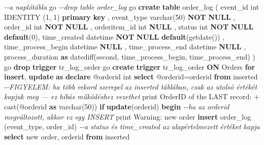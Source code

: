 \documentclass[
  magyar,
]{article}
\newenvironment{Shaded}{}{}
\newcommand{\CommentTok}[1]{\textcolor[rgb]{0.38,0.63,0.69}{\textit{#1}}}
\newcommand{\ControlFlowTok}[1]{\textcolor[rgb]{0.00,0.44,0.13}{\textbf{#1}}}
\newcommand{\DataTypeTok}[1]{\textcolor[rgb]{0.56,0.13,0.00}{#1}}
\newcommand{\DecValTok}[1]{\textcolor[rgb]{0.25,0.63,0.44}{#1}}
\newcommand{\FunctionTok}[1]{\textcolor[rgb]{0.02,0.16,0.49}{#1}}
\newcommand{\KeywordTok}[1]{\textcolor[rgb]{0.00,0.44,0.13}{\textbf{#1}}}
\newcommand{\NormalTok}[1]{#1}
\newcommand{\OperatorTok}[1]{\textcolor[rgb]{0.40,0.40,0.40}{#1}}
\newcommand{\StringTok}[1]{\textcolor[rgb]{0.25,0.44,0.63}{#1}}
\begin{document}
\begin{Shaded}
\begin{Highlighting}[]
\CommentTok{{-}{-}a naplótábla}
\NormalTok{go}
\CommentTok{{-}{-}drop table order\_log}
\NormalTok{go}
\KeywordTok{create} \KeywordTok{table}\NormalTok{ order\_log (}
\NormalTok{    event\_id }\DataTypeTok{int}\NormalTok{ IDENTITY (}\DecValTok{1}\NormalTok{, }\DecValTok{1}\NormalTok{) }\KeywordTok{primary} \KeywordTok{key}\NormalTok{ ,}
\NormalTok{    event\_type }\DataTypeTok{varchar}\NormalTok{(}\DecValTok{50}\NormalTok{) }\KeywordTok{NOT} \KeywordTok{NULL}\NormalTok{ ,}
\NormalTok{    order\_id }\DataTypeTok{int} \KeywordTok{NOT} \KeywordTok{NULL}\NormalTok{ ,}
\NormalTok{    orderitem\_id }\DataTypeTok{int} \KeywordTok{NULL}\NormalTok{ ,}
\NormalTok{    status }\DataTypeTok{int} \KeywordTok{NOT} \KeywordTok{NULL} \KeywordTok{default}\NormalTok{(}\DecValTok{0}\NormalTok{),}
\NormalTok{    time\_created datetime }\KeywordTok{NOT} \KeywordTok{NULL} \KeywordTok{default}\NormalTok{(getdate()) ,}
\NormalTok{    time\_process\_begin datetime }\KeywordTok{NULL}\NormalTok{ ,}
\NormalTok{    time\_process\_end datetime }\KeywordTok{NULL}\NormalTok{ ,}
\NormalTok{    process\_duration }\KeywordTok{as}\NormalTok{ datediff(}\DataTypeTok{second}\NormalTok{, time\_process\_begin, time\_process\_end)}
\NormalTok{)}
\NormalTok{go}
\KeywordTok{drop} \KeywordTok{trigger}\NormalTok{ tr\_log\_order}
\NormalTok{go}
\KeywordTok{create} \KeywordTok{trigger}\NormalTok{ tr\_log\_order }\KeywordTok{ON}\NormalTok{ Orders }\ControlFlowTok{for} \KeywordTok{insert}\NormalTok{, }\KeywordTok{update} \KeywordTok{as}
\KeywordTok{declare}\NormalTok{ @orderid }\DataTypeTok{int}
\KeywordTok{select}\NormalTok{ @orderid}\OperatorTok{=}\NormalTok{orderid }\KeywordTok{from}\NormalTok{ inserted  }\CommentTok{{-}{-}FIGYELEM: ha több rekord szerepel az inserted táblában, csak az utolsó értékét kapjuk meg — ez hibás működéshez vezethet}
\NormalTok{print }\StringTok{\textquotesingle{}OrderID of the LAST record: \textquotesingle{}} \OperatorTok{+} \FunctionTok{cast}\NormalTok{(@orderid }\KeywordTok{as} \DataTypeTok{varchar}\NormalTok{(}\DecValTok{50}\NormalTok{))}
\ControlFlowTok{if} \KeywordTok{update}\NormalTok{(orderid) }\ControlFlowTok{begin}  \CommentTok{{-}{-}ha az orderid megváltozott, akkor ez egy INSERT}
\NormalTok{    print }\StringTok{\textquotesingle{}Warning: new order\textquotesingle{}}
    \KeywordTok{insert}\NormalTok{ order\_log (event\_type, order\_id)  }\CommentTok{{-}{-}a status és time\_created az alapértelmezett értéket kapja}
        \KeywordTok{select} \StringTok{\textquotesingle{}new order\textquotesingle{}}\NormalTok{, orderid }\KeywordTok{from}\NormalTok{ inserted}

\end{Highlighting}
\end{Shaded}
\end{document}
